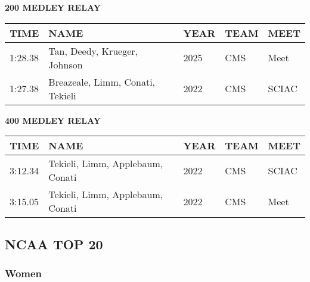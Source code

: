 \begin{table}[H]
\centering
\begin{minipage}[t]{0.6\textwidth}
\centering
\textbf{200 MEDLEY RELAY}\\[0.1cm]
\begin{tabular}{@{}p{1.8cm}p{2.8cm}p{1.2cm}p{1.4cm}p{1.4cm}@{}}
\hline
    \textbf{TIME} & \textbf{NAME} & \textbf{YEAR} & \textbf{TEAM} & \textbf{MEET} \\
\hline
    1:28.38 & Tan, Deedy, Krueger, Johnson & 2025 & CMS & Meet \\
    1:27.38 & Breazeale, Limm, Conati, Tekieli & 2022 & CMS & SCIAC \\
\hline
\end{tabular}
\end{minipage}
\end{table}

\begin{table}[H]
\centering
\begin{minipage}[t]{0.6\textwidth}
\centering
\textbf{400 MEDLEY RELAY}\\[0.1cm]
\begin{tabular}{@{}p{1.8cm}p{2.8cm}p{1.2cm}p{1.4cm}p{1.4cm}@{}}
\hline
    \textbf{TIME} & \textbf{NAME} & \textbf{YEAR} & \textbf{TEAM} & \textbf{MEET} \\
\hline
    3:12.34 & Tekieli, Limm, Applebaum, Conati & 2022 & CMS & SCIAC \\
    3:15.05 & Tekieli, Limm, Applebaum, Conati & 2022 & CMS & Meet \\
\hline
\end{tabular}
\end{minipage}
\end{table}


\newpage

\subsection{NCAA TOP 20}
\subsubsection{Women}

